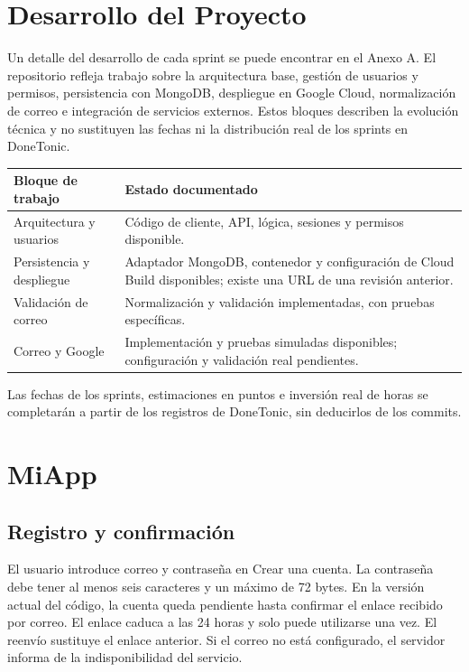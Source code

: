 \section{Desarrollo del Proyecto}
Un detalle del desarrollo de cada sprint se puede encontrar en el Anexo A.
El repositorio refleja trabajo sobre la arquitectura base, gestión de usuarios y permisos, persistencia con MongoDB, despliegue en Google Cloud, normalización de correo e integración de servicios externos. Estos bloques describen la evolución técnica y no sustituyen las fechas ni la distribución real de los sprints en DoneTonic.
\begin{center}
\begin{tabular}{|p{}|p{}|}
\hline
Bloque de trabajo & Estado documentado \\\hline
Arquitectura y usuarios & Código de cliente, API, lógica, sesiones y permisos disponible. \\\hline
Persistencia y despliegue & Adaptador MongoDB, contenedor y configuración de Cloud Build disponibles; existe una URL de una revisión anterior. \\\hline
Validación de correo & Normalización y validación implementadas, con pruebas específicas. \\\hline
Correo y Google & Implementación y pruebas simuladas disponibles; configuración y validación real pendientes. \\\hline
\end{tabular}
\end{center}
Las fechas de los sprints, estimaciones en puntos e inversión real de horas se completarán a partir de los registros de DoneTonic, sin deducirlos de los commits.

\section{MiApp}
\subsection{Registro y confirmación}
El usuario introduce correo y contraseña en Crear una cuenta. La contraseña debe tener al menos seis caracteres y un máximo de 72 bytes. En la versión actual del código, la cuenta queda pendiente hasta confirmar el enlace recibido por correo. El enlace caduca a las 24 horas y solo puede utilizarse una vez. El reenvío sustituye el enlace anterior. Si el correo no está configurado, el servidor informa de la indisponibilidad del servicio.
